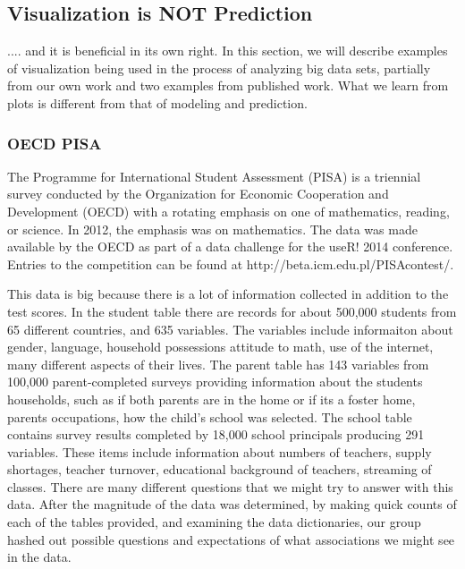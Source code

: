 \documentclass{article}
\begin{document}
\subsection{Visualization is NOT Prediction}

.... and it is beneficial in its own right. In this section, we will describe examples of visualization being used in the process of analyzing big data sets, partially from our own work and two examples from published work. What we learn from plots is different from that of modeling and prediction. 


\subsubsection{OECD PISA}

The Programme for International Student Assessment (PISA) is a triennial survey conducted by the Organization for Economic Cooperation and Development (OECD) with a rotating emphasis on one of mathematics, reading, or science. In 2012, the emphasis was on mathematics. The data was made available by the OECD as part of a data challenge for the useR! 2014 conference. Entries to the competition can be found at http://beta.icm.edu.pl/PISAcontest/. 

This data is big because there is a lot of information collected in addition to the test scores. In the student table there are records for about 500,000 students from 65 different countries, and 635 variables. The variables include informaiton about gender, language, household possessions attitude to math, use of the internet, many different aspects of their lives. The parent table has 143 variables from 100,000 parent-completed surveys providing information about the students households, such as if both parents are in the home or if its a foster home, parents occupations, how the child's school was selected. The school table contains survey results completed by 18,000 school principals producing 291 variables. These items include information about numbers of teachers, supply shortages, teacher turnover, educational background of teachers, streaming of classes. There are many different questions that we might try to answer with this data. After the magnitude of the data was determined, by making quick counts of each of the tables provided, and examining the data dictionaries, our group hashed out possible questions and expectations of what associations we might see in the data.
\end{document}
